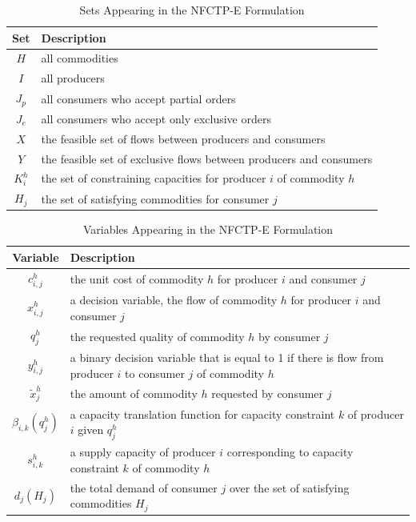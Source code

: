 \begin{table} [h!]
\centering
\begin{tabularx}{\columnwidth-10pt}{|c|X|} %
\hline
Set         & Description \\
\hline
$H$         & all commodities  \\
$I$         & all producers  \\
$J_{p}$     & all consumers who accept partial orders  \\
$J_{e}$     & all consumers who accept only exclusive orders  \\
$X$         & the feasible set of flows between producers and consumers  \\
$Y$         & the feasible set of exclusive flows between 
            producers and consumers  \\
$K_{i}^{h}$ & the set of constraining capacities for 
            producer $i$ of commodity $h$  \\
$H_{j}$     & the set of satisfying commodities for consumer $j$  \\
\hline
\end{tabularx}
\caption{Sets Appearing in the NFCTP-E Formulation}
\label{tbl:NFCTP-E-sets}
\end{table}

\begin{table} [h!]
\centering
\begin{tabularx}{\columnwidth-10pt}{|c|X|} %
\hline
Variable    & Description \\
\hline
$c_{i,j}^{h}$             & the unit cost of commodity $h$ 
                          for producer $i$ and consumer $j$  \\
$x_{i,j}^{h}$             & a decision variable, the flow of commodity $h$ 
                          for producer $i$ and consumer $j$  \\
$q_{j}^{h}$               & the requested quality of commodity $h$ 
                          by consumer $j$  \\
$y_{i,j}^{h}$             & a binary decision variable that is equal to 1 if 
                          there is flow from producer $i$ to consumer $j$ of 
                          commodity $h$ \\
$\tilde{x}_{j}^{h}$       & the amount of commodity $h$ requested by 
                          consumer $j$ \\
$\beta_{i,k}(q_{j}^{h})$  & a capacity translation function for capacity 
                          constraint $k$ of producer $i$ given $q_{j}^{h}$ \\
$s_{i,k}^{h}$             & a supply capacity of producer $i$ corresponding to 
                          capacity constraint $k$ of commodity $h$ \\
$d_{j}(H_{j})$            & the total demand of consumer $j$ over the set of 
                          satisfying commodities $H_{j}$ \\
\hline
\end{tabularx}
\caption{Variables Appearing in the NFCTP-E Formulation}
\label{tbl:NFCTP-E-vars}
\end{table}

